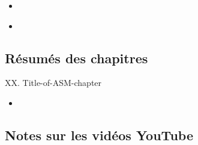 \begin{ASM_chapter}
\begin{itemize}
	\item	{}
\end{itemize}
\end{ASM_chapter}

\begin{YTB_vids}
\begin{itemize}
	\item	
\end{itemize}
\end{YTB_vids}

\subsection{Résumés des chapitres}

\begin{CHPT_SUMM_AUTO}[label = {L.-XX}]{XX. Title-of-ASM-chapter}
	\begin{itemize}
		\item	
	\end{itemize}
\end{CHPT_SUMM_AUTO}

\subsection{Notes sur les vidéos YouTube}

